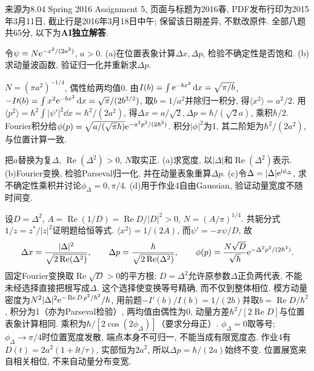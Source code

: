 来源为8.04 Spring 2016 Assignment 5, 页面与标题为2016春, PDF发布行印为2015年3月11日, 截止行是2016年3月18日中午; 保留该日期差异, 不默改原件. 全部八题共65分, 以下为\textbf{AI独立解答}.
\begin{exercise}
令$\psi=N\mathrm e^{-x^2/(2a^2)}$, $a>0$. (a)在位置表象计算$\Delta x,\Delta p$, 检验不确定性是否饱和. (b)求动量波函数, 验证归一化并重新求$\Delta p$.
\end{exercise}
\begin{solution}
$N=(\pi a^2)^{-1/4}$, 偶性给两均值0. 由$I(b)=\int\mathrm e^{-bx^2}\,\mathrm d x=\sqrt{\pi/b}$,$-I\prime(b)=\int x^2\mathrm e^{-bx^2}\,\mathrm d x=\sqrt\pi/(2b^{3/2})$, 取$b=1/a^2$并除归一积分, 得$\langle x^2\rangle=a^2/2$. 用$\langle p^2\rangle=\hbar^2\int|\psi'|^2\dd x=\hbar^2/(2a^2)$, 得$\Delta x=a/\sqrt2,\Delta p=\hbar/(\sqrt2a)$, 乘积$\hbar/2$. Fourier积分给$\phi(p)=\sqrt{a/(\sqrt\pi\hbar)}\mathrm e^{-a^2p^2/(2\hbar^2)}$. 积分$|\phi|^2$为1, 其二阶矩为$\hbar^2/(2a^2)$, 与位置计算一致.
\end{solution}
\begin{exercise}
把$a$替换为复$\Delta$, $\operatorname{Re}(\Delta^2)>0$, $N$取实正. (a)求宽度, 以$|\Delta|$和$\operatorname{Re}(\Delta^2)$表示. (b)Fourier变换, 检验Parseval归一化, 并在动量表象重算$\Delta p$. (c)令$\Delta=|\Delta|\mathrm e^{\mathrm i\phi_\Delta}$, 求不确定性乘积并讨论$\phi_\Delta=0,\pi/4$. (d)用于作业4自由Gaussian, 验证动量宽度不随时间变.
\end{exercise}
\begin{solution}
设$D=\Delta^2$, $A=\operatorname{Re}(1/D)=\operatorname{Re}D/|D|^2>0$, $N=(A/\pi)^{1/4}$. 共轭分式$1/z=z^*/|z|^2$证明题给恒等式. $\langle x^2\rangle=1/(2A)$, 而$\psi'=-x\psi/D$, 故
\[
\Delta x=\frac{|\Delta|^2}{\sqrt{2\operatorname{Re}(\Delta^2)}},\qquad
\Delta p=\frac{\hbar}{\sqrt{2\operatorname{Re}(\Delta^2)}},\qquad
\phi(p)=\frac{N\sqrt D}{\sqrt\hbar}\mathrm e^{-\Delta^2p^2/(2\hbar^2)}.
\]
固定Fourier变换取$\operatorname{Re}\sqrt D>0$的平方根; $D=\Delta^2$允许原参数$\Delta$正负两代表, 不能未经选择直接把根写成$\Delta$. 这个选择使变换等号精确, 而不仅到整体相位. 模方动量密度为$N^2|\Delta|^2\mathrm e^{-\operatorname{Re}D\,p^2/\hbar^2}/\hbar$, 用前题$-I\prime(b)/I(b)=1/(2b)$并取$b=\operatorname{Re}D/\hbar^2$, 积分为1（亦为Parseval检验）, 两均值由偶性为0, 动量方差$\hbar^2/[2\operatorname{Re}D]$与位置表象计算相同. 乘积为$\hbar/[2\cos(2\phi_\Delta)]$（要求分母正）. $\phi_\Delta=0$取等号; $\phi_\Delta\to\pi/4$时位置宽度发散, 端点本身不可归一, 不能当成有限宽度态. 作业4有$D(t)=2a^2(1+\ii t/\tau)$, 实部恒为$2a^2$, 所以$\Delta p=\hbar/(2a)$始终不变. 位置展宽来自相关相位, 不来自动量分布变宽.
\end{solution}
